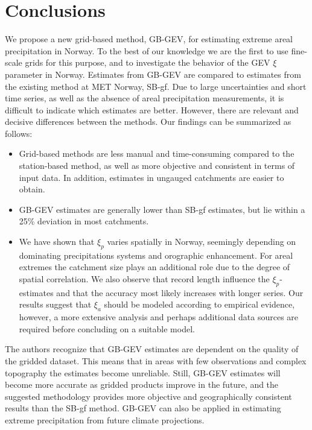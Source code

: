 \documentclass[12pt,a4paper,english]{article}
\begin{document}
\section{Conclusions}

We propose a new grid-based method, GB-GEV, for estimating extreme areal precipitation in Norway. To the best of our knowledge we are the first to use fine-scale grids for this purpose, and to investigate the behavior of the GEV $\xi$ parameter in Norway. Estimates from GB-GEV are compared to estimates from the existing method at MET Norway, SB-gf. Due to large uncertainties and short time series, as well as the absence of areal precipitation measurements, it is difficult to indicate which estimates are better. However, there are relevant and decisive differences between the methods. Our findings can be summarized as follows:

\begin{itemize}
\item Grid-based methods are less manual and time-consuming compared to the station-based method, as well as more objective and consistent in terms of input data. In addition, estimates in ungauged catchments are easier to obtain. %

\item GB-GEV estimates are generally lower than SB-gf estimates, but lie within a 25\% deviation in most catchments.  

\item We have shown that $\xi_{p}$ varies spatially in Norway, seemingly depending on dominating precipitations systems and orographic enhancement. For areal extremes the catchment size plays an additional role due to the degree of spatial correlation. We also observe that record length influence the $\xi_{p}$-estimates and that the accuracy most likely increases with longer series. Our results suggest that $\xi_{a}$ should be modeled according to empirical evidence, however, a more extensive analysis and perhaps additional data sources are required before concluding on a suitable model.
\end{itemize}
 
\noindent The authors recognize that GB-GEV estimates are dependent on the quality of the gridded dataset. This means that in areas with few observations and complex topography the estimates become unreliable. Still, GB-GEV estimates will become more accurate as gridded products  improve in the future, and the suggested methodology provides more objective and geographically consistent results than the SB-gf method. GB-GEV can also be applied in estimating extreme precipitation from future climate projections. 
\end{document}
